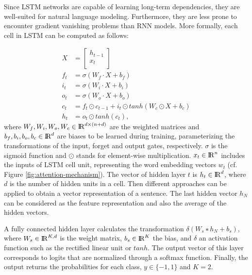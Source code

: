 Since LSTM networks are capable of learning long-term dependencies, they are well-suited for natural language modeling. Furthermore, they are less prone to encounter gradient vanishing problems than RNN models. More formally, each cell in LSTM can be computed as follows:

\begin{align}
	X & =\begin{bmatrix}
	h_{t-1} \\
	x_{t} \\
	\end{bmatrix}\\	
	f_{t} & = \sigma(W_{f} \cdot X + b_{f} )  \\
	i_{t} & = \sigma(W_{i} \cdot X + b_{i} )  \\
	o_{t} & = \sigma(W_{o} \cdot X + b_{o} )  \\
	c_{t} & = f_{t} \odot c_{t-1} + i_{t} \odot \mathit{tanh}(W_{c}  \odot X + b_{c})\\
	h_{t} & = o_{t} \odot tanh(c_{t}),
\end{align}		
where $W_{f} , W_{i} , W_{o}, W_{c} \in {\rm I\!R}^{d\times(n + d)}$ are the weighted matrices and $ b_{f},  b_{i}, b_{o}, b_{c} \in {\rm I\!R}^{d}$ are biases to be learned during training, parameterizing the transformations of the input, forget and output gates, respectively. $\sigma$ is the sigmoid function and $\odot$ stands for element-wise multiplication. $ x_{t} \in {\rm I\!R}^{n}$ includes the inputs of LSTM cell unit, representing the word embedding vectors $w_{t}$ (cf. Figure \ref{fig:attention-mechanism}). The vector of hidden layer $t$ is $h_{t} \in {\rm I\!R}^{d}$, where $d$ is the number of hidden units in a cell. Then different approaches can be applied to obtain a vector representation of a sentence. The last hidden vector $h_{N}$ can be considered as the feature representation and also the average of the hidden vectors.

A fully connected hidden layer calculates the transformation $\delta(W_{s} ∗ h_{N} + b_{s})$, where $W_{s} \in {\rm I\!R}^{K,d}$ is the weight matrix, $b_{s} \in {\rm I\!R}^{K}$ the bias, and $\delta$ an  activation function such as the rectified linear unit or $\mathit{tanh}$. The output vector of this layer corresponds to logits that are normalized through a softmax function. Finally, the output returns the probabilities for each class, $y\in \{-1, 1\} $ and $K=2$.
	
